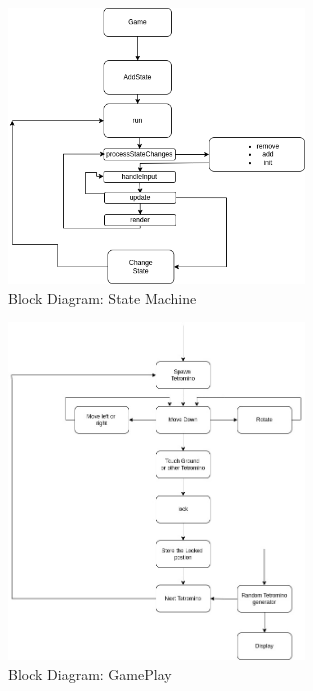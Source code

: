 \begin{figure}[H]
	\centering
	\includegraphics[width=0.7\textwidth]{images/StateMachine.png}
	\caption{Block Diagram: State Machine}
\end{figure}

\begin{figure}[H]
	\centering
	\includegraphics[width=0.7\textwidth]{images/GamePlayBlockDiagram.jpg}
	\caption{Block Diagram: GamePlay}
\end{figure}

